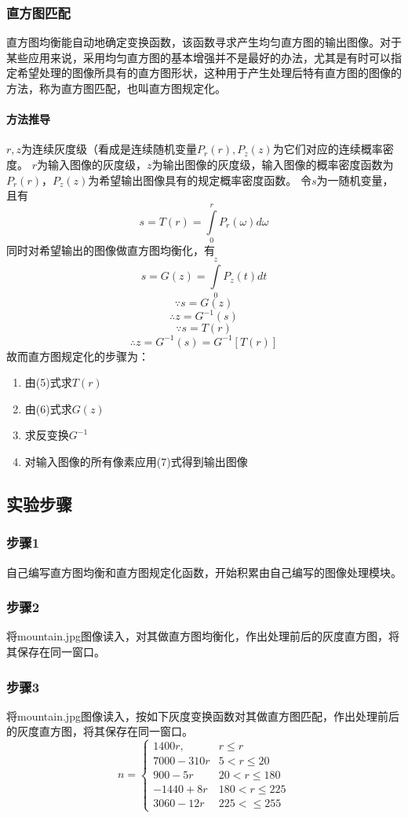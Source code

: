\documentclass[]{IEEEphot}
\begin{document}
\subsubsection{直方图匹配}
直方图均衡能自动地确定变换函数，该函数寻求产生均匀直方图的输出图像。对于某些应用来说，采用均匀直方图的基本增强并不是最好的办法，尤其是有时可以指定希望处理的图像所具有的直方图形状，这种用于产生处理后特有直方图的图像的方法，称为直方图匹配，也叫直方图规定化。
\paragraph{方法推导}
$r,z$为连续灰度级（看成是连续随机变量$P_r(r),P_z(z)$为它们对应的连续概率密度。
$r$为输入图像的灰度级，$z$为输出图像的灰度级，输入图像的概率密度函数为$P_r(r)$，$P_z(z)$为希望输出图像具有的规定概率密度函数。
令$s$为一随机变量，且有
\begin{equation}
s=T(r)=\int\limits_{0}^{r}P_r(\omega)d\omega
\end{equation}
同时对希望输出的图像做直方图均衡化，有
\begin{equation}
s=G(z)=\int\limits_{0}^{z}P_z(t)dt
\end{equation}
$$\because s=G(z)$$
$$\therefore z=G^{-1}(s)$$
$$\because s=T(r)$$
\begin{equation}
\therefore z=G^{-1}(s)=G^{-1}[T(r)]
\end{equation}
故而直方图规定化的步骤为：
\begin{enumerate}
\item 由(5)式求$T(r)$
\item 由(6)式求$G(z)$
\item 求反变换$G^{-1}$
\item 对输入图像的所有像素应用(7)式得到输出图像
\end{enumerate}
\subsection{实验步骤}
\subsubsection{步骤1}
自己编写直方图均衡和直方图规定化函数，开始积累由自己编写的图像处理模块。
\subsubsection{步骤2}
将mountain.jpg图像读入，对其做直方图均衡化，作出处理前后的灰度直方图，将其保存在同一窗口。
\subsubsection{步骤3}
将mountain.jpg图像读入，按如下灰度变换函数对其做直方图匹配，作出处理前后的灰度直方图，将其保存在同一窗口。
\begin{equation}
n=
\left\{
\begin{array}{lr}
1400r,    & r\leq r\\
7000-310r & 5<r\leq 20\\
900-5r    & 20<r\leq 180\\
-1440+8r  & 180<r\leq 225\\
3060-12r  & 225<\leq 255
\end{array}
\right.
\end{equation}
\end{document}

